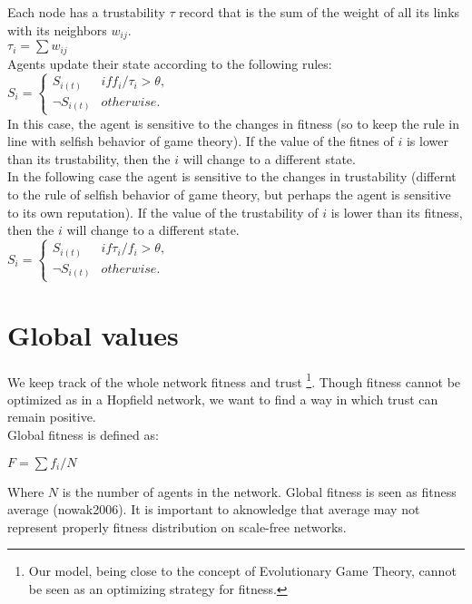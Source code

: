 \documentclass[11pt]{article} \usepackage{amsmath}
\begin{document}
Each node has a trustability $\tau$ record that is the sum of the weight of all its links with its neighbors $w_{ij}$.\\

$\tau_{i} = \sum w_{ij}$\\

Agents update their state according to the following rules:\\

$S_{i} = \begin{cases} S_{i(t)} & if  f_{i}/\tau_{i} > \theta,\\
  \neg S_{i(t)} &  otherwise. \end{cases} $\\

In this case, the agent is sensitive to the changes in fitness (so to keep the rule in line with selfish behavior of game theory). If the value of the fitnes of $i$ is lower than its trustability, then the $i$ will change to a different state.\\

In the following case the agent is sensitive to the changes in trustability (differnt to the rule of selfish behavior of game theory, but perhaps the agent is sensitive to its own reputation). If the value of the trustability of $i$ is lower than its fitness, then the $i$ will change to a different state.\\

$S_{i} = \begin{cases} S_{i(t)} & if  \tau_{i}/f_{i} > \theta,\\
  \neg S_{i(t)} &  otherwise. \end{cases} $\\

\section{Global values}

We keep track of the whole network fitness and trust \footnote{Our model, being close to the concept of Evolutionary Game Theory, cannot be seen as an optimizing strategy for fitness.}. Though fitness cannot be optimized as in a Hopfield network, we want to find a way in which trust can remain positive.\\

Global fitness is defined as:

$F = \sum f_{i}/N$

Where $N$ is the number of agents in the network. Global fitness is seen as fitness average (nowak2006). It is important to aknowledge that average may not represent properly fitness distribution on scale-free networks.\\
\end{document}
